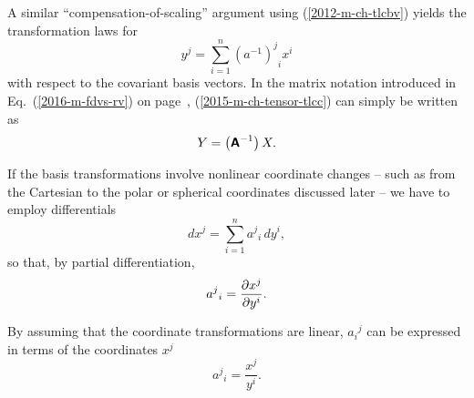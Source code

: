 A similar ``compensation-of-scaling'' argument using
(\ref{2012-m-ch-tlcbv})
yields the transformation laws for
\begin{equation}
{ y }^j   = \sum_{i=1}^n {(a^{-1})^j}_i {x}^i
\label{2015-m-ch-tensor-tlcc}
\end{equation}
with respect to the covariant basis vectors.
In the matrix notation introduced in Eq.~(\ref{2016-m-fdvs-rv}) on page~\pageref{2016-m-fdvs-rv},
(\ref{2015-m-ch-tensor-tlcc}) can simply be written as
\begin{equation}
 Y    =  \left(\textsf{\textbf{A}}^{-1}\right) X.
\label{2016-m-ch-di-tlcc-mn}
\end{equation}


If the basis transformations involve nonlinear coordinate changes -- such as from the
Cartesian to the polar or spherical coordinates discussed later -- we have to employ differentials
\begin{equation}
dx^j   = \sum_{i=1}^n {a^j}_i \,d{ y }^i  ,
\label{2012-m-ch-di-choic11}
\end{equation}
so that, by partial differentiation,
\begin{equation}
{a^j}_i ={\partial x^j \over \partial  y ^i}   .
\label{2001-mu-tensor-tl11}
\end{equation}

By assuming that the coordinate transformations are linear, ${a_i}^j$ can be expressed in terms of the coordinates $x^j$
\begin{equation}
{a^j}_i =\frac{  x^j }{   y ^i}  .
\label{2001-mu-tensor-tl1}
\end{equation}


